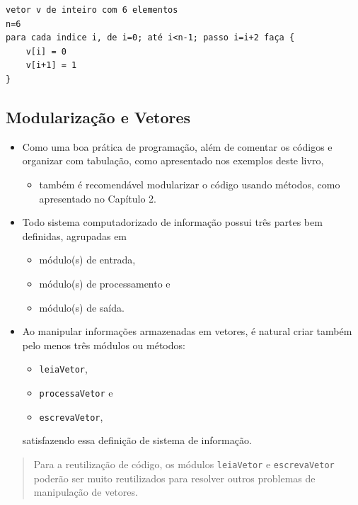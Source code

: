 \documentclass[12pt,a4paper]{article}
\providecommand{\tightlist}{%
      \setlength{\itemsep}{0pt}\setlength{\parskip}{0pt}}
\begin{document}
    \begin{verbatim}
vetor v de inteiro com 6 elementos
n=6
para cada indice i, de i=0; até i<n-1; passo i=i+2 faça {
    v[i] = 0
    v[i+1] = 1
}
\end{verbatim}

    \hypertarget{modularizauxe7uxe3o-e-vetores}{%
\subsection{Modularização e
Vetores}\label{modularizauxe7uxe3o-e-vetores}}

    \begin{itemize}
\tightlist
\item
  Como uma boa prática de programação, além de comentar os códigos e
  organizar com tabulação, como apresentado nos exemplos deste livro,

  \begin{itemize}
  \tightlist
  \item
    também é recomendável modularizar o código usando métodos, como
    apresentado no Capítulo 2.
  \end{itemize}
\item
  Todo sistema computadorizado de informação possui três partes bem
  definidas, agrupadas em

  \begin{itemize}
  \tightlist
  \item
    módulo(s) de entrada,
  \item
    módulo(s) de processamento e
  \item
    módulo(s) de saída.
  \end{itemize}
\item
  Ao manipular informações armazenadas em vetores, é natural criar
  também pelo menos três módulos ou métodos:

  \begin{itemize}
  \tightlist
  \item
    \texttt{leiaVetor},
  \item
    \texttt{processaVetor} e
  \item
    \texttt{escrevaVetor},
  \end{itemize}

  satisfazendo essa definição de sistema de informação.
\end{itemize}

\begin{quote}
Para a reutilização de código, os módulos \texttt{leiaVetor} e
\texttt{escrevaVetor} poderão ser muito reutilizados para resolver
outros problemas de manipulação de vetores.
\end{quote}
\end{document}
